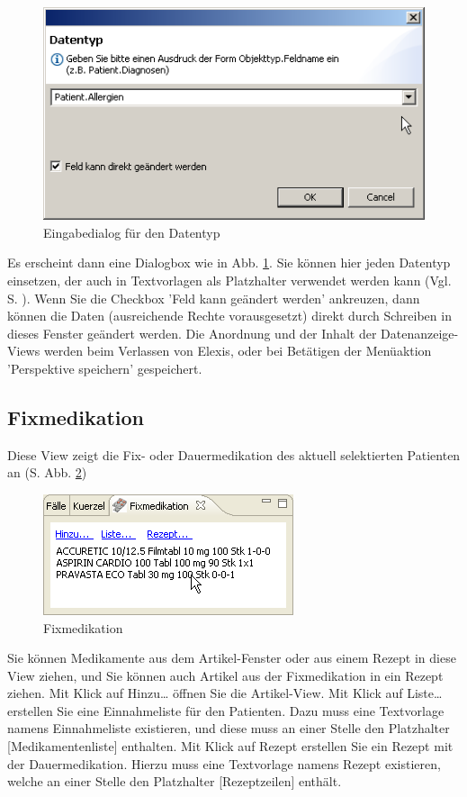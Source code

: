 \begin{figure}[hb]
\includegraphics{images/data2}
\caption{Eingabedialog für den Datentyp}
\label{figure2}
\end{figure}
Es erscheint dann eine Dialogbox wie in Abb. \ref{figure2}.
Sie können hier jeden Datentyp einsetzen, der auch in Textvorlagen als
Platzhalter verwendet werden kann (Vgl. S. \pageref{Platzhalter}).
Wenn Sie die Checkbox 'Feld kann geändert werden' ankreuzen, dann können die
Daten (ausreichende Rechte vorausgesetzt) direkt durch Schreiben in dieses
Fenster geändert werden.
Die Anordnung und der Inhalt der Datenanzeige-Views werden beim Verlassen von
Elexis, oder bei Betätigen der Menüaktion 'Perspektive speichern' gespeichert.

\subsection{Fixmedikation}
Diese View zeigt die Fix- oder Dauermedikation des aktuell selektierten
Patienten an (S. Abb. \ref{fig:fixmedi})

\begin{figure}[htp]
\begin{center}
  \includegraphics{images/fixmediview}
  \caption{Fixmedikation}
  \label{fig:fixmedi}
\end{center}
\end{figure}
Sie können Medikamente aus dem Artikel-Fenster oder aus einem Rezept in diese
View ziehen, und Sie können auch Artikel aus der Fixmedikation in ein Rezept
ziehen. Mit Klick auf \glqq Hinzu\ldots\grqq{} öffnen Sie die Artikel-View. Mit
Klick auf \glqq Liste\ldots\grqq{} erstellen Sie eine Einnahmeliste für den
Patienten. Dazu muss eine Textvorlage namens \glqq Einnahmeliste\grqq{}
existieren, und diese muss an einer Stelle den Platzhalter [Medikamentenliste]
enthalten. Mit Klick auf \glqq Rezept\grqq{} erstellen Sie ein Rezept mit der
Dauermedikation. Hierzu muss eine Textvorlage namens \glqq Rezept\grqq
existieren, welche an einer Stelle den Platzhalter [Rezeptzeilen] enthält.

